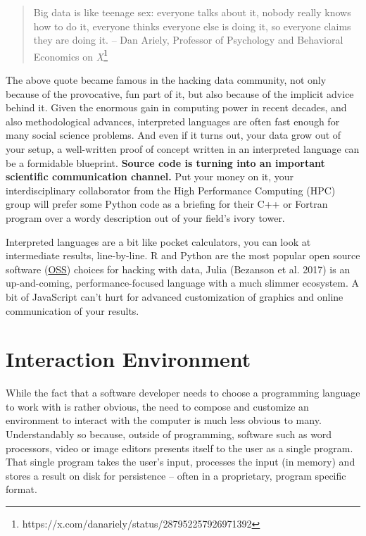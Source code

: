 \documentclass[
  12pt,
  letterpaper,
]{krantz}
\begin{document}
\begin{quote}
Big data is like teenage sex: everyone talks about it, nobody really
knows how to do it, everyone thinks everyone else is doing it, so
everyone claims they are doing it. -- Dan Ariely, Professor of
Psychology and Behavioral Economics on \emph{X}\footnote{https://x.com/danariely/status/287952257926971392}
\end{quote}

\newpage

The above quote became famous in the hacking data community, not only
because of the provocative, fun part of it, but also because of the
implicit advice behind it. Given the enormous gain in computing power in
recent decades, and also methodological advances, interpreted languages
are often fast enough for many social science problems. And even if it
turns out, your data grow out of your setup, a well-written proof of
concept written in an interpreted language can be a formidable
blueprint. \textbf{Source code is turning into an important scientific
communication channel.} Put your money on it, your interdisciplinary
collaborator from the High Performance Computing (HPC) group will prefer
some Python code as a briefing for their C++ or Fortran program over a
wordy description out of your field's ivory tower.

Interpreted languages are a bit like pocket calculators, you can look at
intermediate results, line-by-line. R and Python are the most popular
open source software (\protect\hyperlink{glossary}{OSS}) choices for
hacking with data, Julia (Bezanson et al. 2017) is an up-and-coming,
performance-focused language with a much slimmer ecosystem. A bit of
JavaScript can't hurt for advanced customization of graphics and online
communication of your results.

\hypertarget{interaction-environment}{%
\section{Interaction Environment}\label{interaction-environment}}

While the fact that a software developer needs to choose a programming
language to work with is rather obvious, the need to compose and
customize an environment to interact with the computer is much less
obvious to many. Understandably so because, outside of programming,
software such as word processors, video or image editors presents itself
to the user as a single program. That single program takes the user's
input, processes the input (in memory) and stores a result on disk for
persistence -- often in a proprietary, program specific format.
\end{document}
